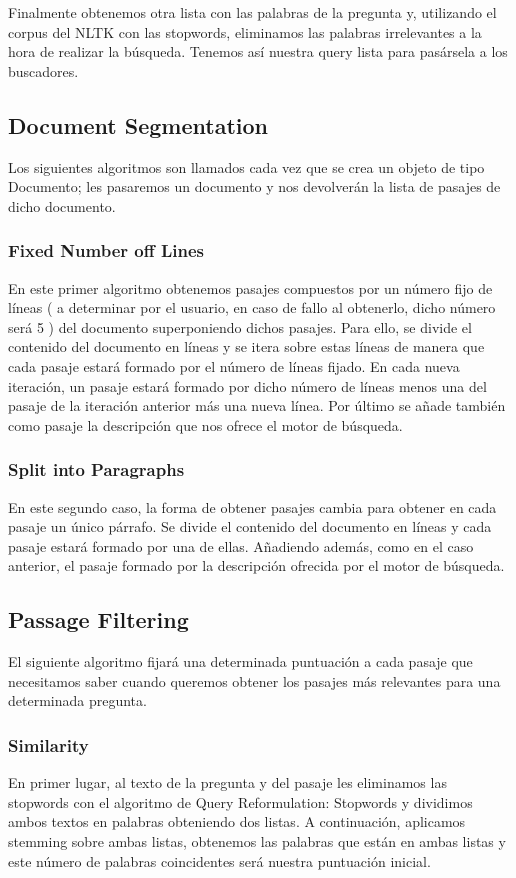 \documentclass[12pt,a4paper,titlepage]{article}
\begin{document}
Finalmente obtenemos otra lista con las palabras de la pregunta y, utilizando el corpus del NLTK con las stopwords, eliminamos las palabras irrelevantes a la hora de realizar la búsqueda. Tenemos así nuestra query lista para pasársela a los buscadores.

\subsection{Document Segmentation}
Los siguientes algoritmos son llamados cada vez que se crea un objeto de tipo Documento; les pasaremos un documento y nos devolverán la lista de pasajes de dicho documento.

\subsubsection{Fixed Number off Lines}
En este primer algoritmo obtenemos pasajes compuestos por un número fijo de líneas ( a determinar por el usuario, en caso de fallo al obtenerlo, dicho número será 5 ) del documento superponiendo dichos pasajes. Para ello, se divide el contenido del documento en líneas y se itera sobre estas líneas de manera que cada pasaje estará formado por el número de líneas fijado. En cada nueva iteración, un pasaje estará formado por dicho número de líneas menos una del pasaje de la iteración anterior más una nueva línea. Por último se añade también como pasaje la descripción que nos ofrece el motor de búsqueda.

\subsubsection{Split into Paragraphs}
En este segundo caso, la forma de obtener pasajes cambia para obtener en cada pasaje un único párrafo. Se divide el contenido del documento en líneas y cada pasaje estará formado por una de ellas. Añadiendo además, como en el caso anterior, el pasaje formado por la descripción ofrecida por el motor de búsqueda.

\subsection{Passage Filtering}
El siguiente algoritmo fijará una determinada puntuación a cada pasaje que necesitamos saber cuando queremos obtener los pasajes más relevantes para una determinada pregunta.

\subsubsection{Similarity}
En primer lugar, al texto de la pregunta y del pasaje les eliminamos las stopwords con el algoritmo de Query Reformulation: Stopwords y dividimos ambos textos en palabras obteniendo dos listas. A continuación, aplicamos stemming sobre ambas listas, obtenemos las palabras que están en ambas listas y este número de palabras coincidentes será nuestra puntuación inicial.
\end{document}
